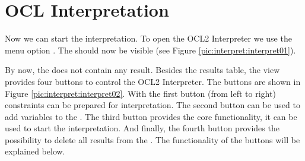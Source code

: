 \section{OCL Interpretation}

Now we can start the interpretation. To open the \acs{OCL}2 Interpreter we use the menu option . The  should now be visible (see Figure \ref{pic:interpret:interpret01}).

By now, the  does not contain any result. Besides the results table, the view provides four buttons to control the \acs{OCL}2 Interpreter. The buttons are shown in Figure \ref{pic:interpret:interpret02}. With the first button (from left to right) constraints can be prepared for interpretation. The second button can be used to add variables to the . The third button provides the core functionality, it can be used to start the interpretation. And finally, the fourth button provides the possibility to delete all results from the . The functionality of the buttons will be explained below.

